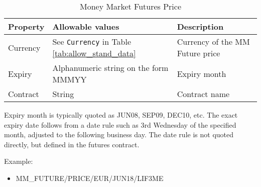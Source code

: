 \begin{table}[H]
\centering
\begin{tabular}{|p{3cm}|p{4.5cm}|p{7cm}|}
\hline
{\bf Property} & {\bf Allowable values} & {\bf Description} \\
\hline
Currency & See \lstinline!Currency! in Table \ref{tab:allow_stand_data}& Currency of the MM Future price\\ \hline
Expiry & Alphanumeric string on the form MMMYY & Expiry month\\ \hline
Contract & String & Contract name\\
\hline
\end{tabular}
  \caption{Money Market Futures Price}
  \label{tab:mmfp_quote}
\end{table}

Expiry month is typically quoted as JUN08, SEP09, DEC10, etc. The exact expiry date follows from a date rule such as 3rd Wednesday of the specified month, adjusted to the following business day. The date rule is not quoted directly, but defined in the futures contract.

\medskip
Example: 
\begin{itemize}
\item {MM\_FUTURE/PRICE/EUR/JUN18/LIF3ME}
\end{itemize}

%
%
%

